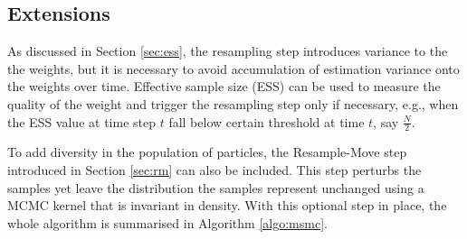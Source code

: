 \subsection{Extensions}
As discussed in Section \ref{sec:ess}, the resampling step introduces variance to the the weights, but it is necessary to avoid accumulation of estimation variance onto the weights over time. Effective sample size (ESS) can be used to measure the quality of the weight and trigger the resampling step only if necessary, e.g., 
when the ESS value at time step $t$ fall below certain threshold at time $t$, say $\frac{N}{2}$.

To add diversity in the population of particles, the Resample-Move step introduced in Section \ref{sec:rm} can also be included. This step perturbs the samples yet leave the distribution the samples represent unchanged using a MCMC kernel that is invariant in density. With this optional step in place, the whole algorithm is summarised in Algorithm \ref{algo:msmc}.

